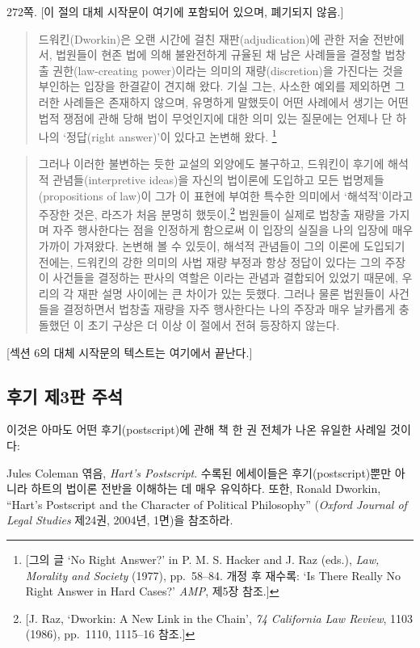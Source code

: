 {\footnotesize
\noteentry 272쪽. {[}이 절의 대체 시작문이 여기에 포함되어 있으며, 폐기되지
않음.{]}

\begin{quote}
드워킨(Dworkin)은 오랜 시간에 걸친 재판(adjudication)에 관한 저술
전반에서, 법원들이 현존 법에 의해 불완전하게 규율된 채 남은 사례들을
결정할 법창출 권한(law-creating power)이라는 의미의 재량(discretion)을
가진다는 것을 부인하는 입장을 한결같이 견지해 왔다. 기실 그는, 사소한
예외를 제외하면 그러한 사례들은 존재하지 않으며, 유명하게 말했듯이 어떤
사례에서 생기는 어떤 법적 쟁점에 관해 당해 법이 무엇인지에 대한 의미
있는 질문에는 언제나 단 하나의 ‘정답(right answer)’이 있다고 논변해
왔다. \footnote{{[}그의 글 `No Right Answer?' in P. M. S. Hacker and J.
  Raz (eds.), \emph{Law, Morality and Society} (1977), pp.~58--84. 개정
  후 재수록: `Is There Really No Right Answer in Hard Cases?'
  \emph{AMP}, 제5장 참조.{]}}
\end{quote}

\begin{quote}
그러나 이러한 불변하는 듯한 교설의 외양에도 불구하고, 드워킨이 후기에
해석적 관념들(interpretive ideas)을 자신의 법이론에 도입하고 모든
법명제들(propositions of law)이 그가 이 표현에 부여한 특수한 의미에서
‘해석적’이라고 주장한 것은, 라즈가 처음 분명히 했듯이,\footnote{{[}J.
  Raz, `Dworkin: A New Link in the Chain', \emph{74 California Law
  Review}, 1103 (1986), pp.~1110, 1115--16 참조.{]}} 법원들이 실제로
법창출 재량을 가지며 자주 행사한다는 점을 인정하게 함으로써 이 입장의
실질을 나의 입장에 매우 가까이 가져왔다. 논변해 볼 수 있듯이, 해석적
관념들이 그의 이론에 도입되기 전에는, 드워킨의 강한 의미의 사법 재량
부정과 항상 정답이 있다는 그의 주장이 사건들을 결정하는 판사의 역할은
 이라는 관념과 결합되어
있었기 때문에, 우리의 각 재판 설명 사이에는 큰 차이가 있는 듯했다.
그러나 물론 법원들이 사건들을 결정하면서 법창출 재량을 자주 행사한다는
나의 주장과 매우 날카롭게 충돌했던 이 초기 구상은 더 이상 이 절에서 전혀
등장하지 않는다.
\end{quote}

{[}섹션 6의 대체 시작문의 텍스트는 여기에서 끝난다.{]}

\subsection{후기 제3판
주석}\label{uxd6c4uxae30-uxc81c3uxd310-uxc8fcuxc11d}

이것은 아마도 어떤 후기(postscript)에 관해 책 한 권 전체가 나온 유일한
사례일 것이다:

Jules Coleman 엮음, \emph{Hart's Postscript}. 수록된 에세이들은
후기(postscript)뿐만 아니라 하트의 법이론 전반을 이해하는 데 매우
유익하다. 또한, Ronald Dworkin, “Hart's Postscript and the Character of
Political Philosophy” (\emph{Oxford Journal of Legal Studies} 제24권,
2004년, 1면)을 참조하라.
}
